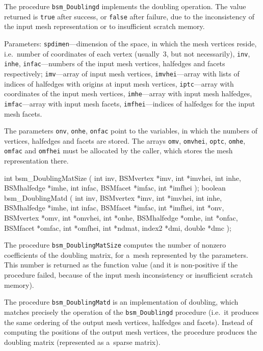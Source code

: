 The procedure \texttt{bsm\_Doublingd} implements the doubling operation. The
value returned is \texttt{true} after success, or \texttt{false} after
failure, due to the inconsistency of the input mesh representation or to
insufficient scratch memory.

Parameters: \texttt{spdimen}---dimension of the space, in which the mesh
vertices reside, i.e.\ number of coordinates of each vertex (usually~$3$,
but not necessarily), \texttt{inv}, \texttt{inhe}, \texttt{infac}---numbers of
the input mesh vertices, halfedges and facets respectively;
\texttt{imv}---array of input mesh vertices, \texttt{imvhei}---array with
lists of indices of halfedges with origins at input mesh vertices,
\texttt{iptc}---array with coordinates of the input mesh vertices,
\texttt{imhe}---array with input mesh halfedges, \texttt{imfac}---array with
input mesh facets, \texttt{imfhei}---indices of halfedges for the input mesh
facets.

The parameters \texttt{onv}, \texttt{onhe}, \texttt{onfac} point to the
variables, in which the numbers of vertices, halfedges and facets are
stored. The arrays \texttt{omv}, \texttt{omvhei}, \texttt{optc},
\texttt{omhe}, \texttt{omfac} and \texttt{omfhei} must be allocated by the
caller, which stores the mesh representation there.

\medskip
\begin{listingC}
int bsm_DoublingMatSize ( int inv, BSMvertex *imv, int *imvhei,
                          int inhe, BSMhalfedge *imhe,
                          int infac, BSMfacet *imfac, int *imfhei );
boolean bsm_DoublingMatd ( int inv, BSMvertex *imv, int *imvhei,
                           int inhe, BSMhalfedge *imhe,
                           int infac, BSMfacet *imfac, int *imfhei,
                           int *onv, BSMvertex *omv, int *omvhei,  
                           int *onhe, BSMhalfedge *omhe,
                           int *onfac, BSMfacet *omfac, int *omfhei,
                           int *ndmat, index2 *dmi, double *dmc );  
\end{listingC}
The procedure \texttt{bsm\_DoublingMatSize} computes the number of nonzero
coefficients of the doubling matrix, for a~mesh represented by the
parameters. This number is returned as the function value (and it is
non-positive if the procedure failed, because of the input mesh
inconsistency or insufficient scratch memory).

The procedure \texttt{bsm\_DoublingMatd} is an implementation of doubling,
which matches precisely the operation of the \texttt{bsm\_Doublingd}
procedure (i.e.\ it produces the same ordering of the output mesh vertices,
halfedges and facets). Instead of computing the positions of the output mesh
vertices, the procedure produces the doubling matrix (represented as
a~sparse matrix).

